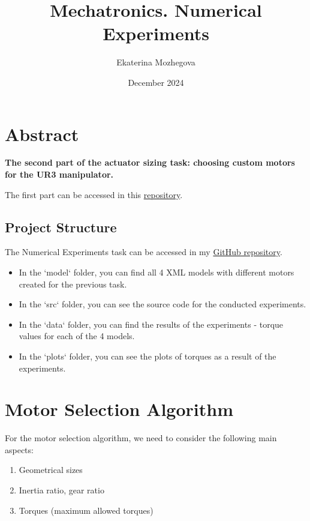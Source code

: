 \documentclass{article}
\title{Mechatronics. Numerical Experiments}
\author{Ekaterina Mozhegova}
\date{December 2024}
\begin{document}
\maketitle

\section*{Abstract}

\textbf{The second part of the actuator sizing task: choosing custom motors for the UR3 manipulator.}

The first part can be accessed in this \href{https://github.com/illusoryTwin/ActuatorSizing/tree/main}{repository}.

\subsection*{Project Structure}

The Numerical Experiments task can be accessed in my \href{https://github.com/illusoryTwin/NumericalExperimentsforActuatorSizing}{GitHub repository}.

\begin{itemize}
    \item In the `model` folder, you can find all 4 XML models with different motors created for the previous task.  
    \item In the `src` folder, you can see the source code for the conducted experiments.
    \item In the `data` folder, you can find the results of the experiments - torque values for each of the 4 models.
    \item In the `plots` folder, you can see the plots of torques as a result of the experiments.
\end{itemize}


\section{Motor Selection Algorithm}

For the motor selection algorithm, we need to consider the following main aspects:

\begin{enumerate}
    \item Geometrical sizes
    \item Inertia ratio, gear ratio
    \item Torques (maximum allowed torques)
\end{enumerate}
\end{document}
